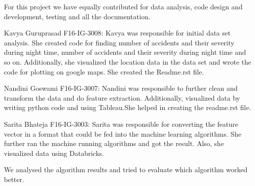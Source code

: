 \documentclass{acm_proc_article-sp}
\begin{document}
For this project we have equally contributed for data analysis, code design and development, testing and all the documentation.

Kavya Guruprasad
F16-IG-3008:
Kavya was responsible for initial data set analysis. She created code for finding number of accidents and their severity during night time, number of accidents and their severity during night time and so on. Additionally, she visualized the location data in the data set and wrote the code for plotting on google maps. She created the Readme.rst file.

Nandini Goswami
F16-IG-3007:
Nandini was responsible to further clean and transform the data and do feature extraction.  Additionally, visualized data by writing python code and using Tableau.She helped in creating the readme.rst file. 

Sarita Bhateja
F16-IG-3003:
Sarita was responsible for converting the feature vector in a format that could be fed into the machine learning algorithms. She further ran the machine running algorithms and got the result. Also, she visualized data using Databricks.

We analysed the algorithm results and tried to evaluate which algorithm worked better.






\end{document}
